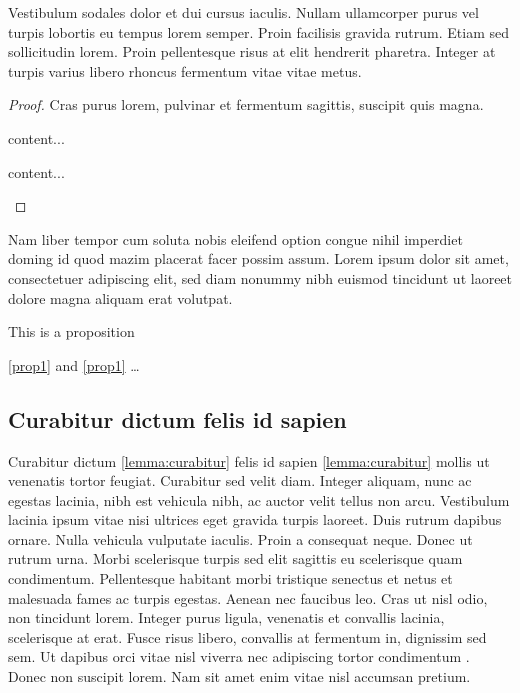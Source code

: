 \documentclass[a4paper ,UKenglish  ,cleveref ,autoref ,thm-restate   ]{lipics-v2019}
\begin{document}
\begin{lemma}
\label{lemma:lorem}
Vestibulum sodales dolor et dui cursus iaculis. Nullam ullamcorper purus vel turpis lobortis eu tempus lorem semper. Proin facilisis gravida rutrum. Etiam sed sollicitudin lorem. Proin pellentesque risus at elit hendrerit pharetra. Integer at turpis varius libero rhoncus fermentum vitae vitae metus.
\end{lemma}

\begin{proof}
Cras purus lorem, pulvinar et fermentum sagittis, suscipit quis magna.

\begin{claim}
content...
\end{claim}
\begin{claimproof}
content...
\end{claimproof}

\end{proof}

\begin{corollary}
\label{lemma:curabitur}
Nam liber tempor cum soluta nobis eleifend option congue nihil imperdiet doming id quod mazim placerat facer possim assum. Lorem ipsum dolor sit amet, consectetuer adipiscing elit, sed diam nonummy nibh euismod tincidunt ut laoreet dolore magna aliquam erat volutpat.
\end{corollary}

\begin{proposition}\label{prop1}
This is a proposition
\end{proposition}

\autoref{prop1} and \cref{prop1} \ldots

\subsection{Curabitur dictum felis id sapien}

Curabitur dictum \cref{lemma:curabitur} felis id sapien
\autoref{lemma:curabitur} mollis ut venenatis tortor feugiat. Curabitur
sed velit diam. Integer aliquam, nunc ac egestas lacinia, nibh est
vehicula nibh, ac auctor velit tellus non arcu. Vestibulum lacinia ipsum
vitae nisi ultrices eget gravida turpis laoreet. Duis rutrum dapibus
ornare. Nulla vehicula vulputate iaculis. Proin a consequat neque. Donec
ut rutrum urna. Morbi scelerisque turpis sed elit sagittis eu
scelerisque quam condimentum. Pellentesque habitant morbi tristique
senectus et netus et malesuada fames ac turpis egestas. Aenean nec
faucibus leo. Cras ut nisl odio, non tincidunt lorem. Integer purus
ligula, venenatis et convallis lacinia, scelerisque at erat. Fusce risus
libero, convallis at fermentum in, dignissim sed sem. Ut dapibus orci
vitae nisl viverra nec adipiscing tortor condimentum
\cite{DBLP:journals/cacm/Dijkstra68a}. Donec non suscipit lorem. Nam sit
amet enim vitae nisl accumsan pretium.
\end{document}
